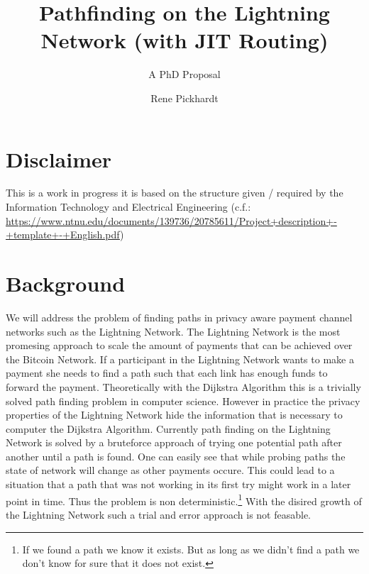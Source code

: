 \documentclass[a4paper,latin]{paper}
\title{Pathfinding on the Lightning Network (with JIT Routing)}
\subtitle{A PhD Proposal}
\author{Rene Pickhardt}
\begin{document}
 
\section{Disclaimer}
This is a work in progress it is based on the structure given / required by the Information Technology and Electrical Engineering (c.f.: \url{https://www.ntnu.edu/documents/139736/20785611/Project+description+-+template+-+English.pdf})

\section{Background}
We will address the problem of finding paths in privacy aware payment channel networks such as the Lightning Network.
The Lightning Network is the most promesing approach to scale the amount of payments that can be achieved over the Bitcoin Network.
If a participant in the Lightning Network wants to make a payment she needs to find a path such that each link has enough funds to forward the payment.
Theoretically with the Dijkstra Algorithm this is a trivially solved path finding problem in computer science.
However in practice the privacy properties of the Lightning Network hide the information that is necessary to computer the Dijkstra Algorithm.
Currently path finding on the Lightning Network is solved by a bruteforce approach of trying one potential path after another until a path is found.
One can easily see that while probing paths the state of network will change as other payments occure.
This could lead to a situation that a path that was not working in its first try might work in a later point in time.
Thus the problem is non deterministic.\footnote{If we found a path we know it exists. But as long as we didn't find a path we don't know for sure that it does not exist.}
With the disired growth of the Lightning Network such a trial and error approach is not feasable.
\end{document}

